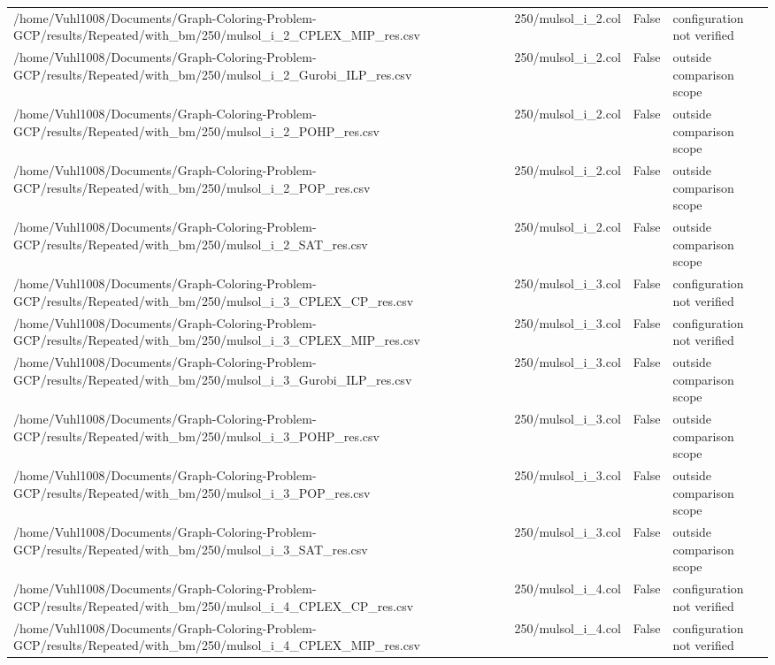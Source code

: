 \begin{table}[htbp]
\begin{tabular}{llll}
/home/Vuhl1008/Documents/Graph-Coloring-Problem-GCP/results/Repeated/with\_bm/250/mulsol\_i\_2\_CPLEX\_MIP\_res.csv & 250/mulsol\_i\_2.col & False & configuration not verified \\
/home/Vuhl1008/Documents/Graph-Coloring-Problem-GCP/results/Repeated/with\_bm/250/mulsol\_i\_2\_Gurobi\_ILP\_res.csv & 250/mulsol\_i\_2.col & False & outside comparison scope \\
/home/Vuhl1008/Documents/Graph-Coloring-Problem-GCP/results/Repeated/with\_bm/250/mulsol\_i\_2\_POHP\_res.csv & 250/mulsol\_i\_2.col & False & outside comparison scope \\
/home/Vuhl1008/Documents/Graph-Coloring-Problem-GCP/results/Repeated/with\_bm/250/mulsol\_i\_2\_POP\_res.csv & 250/mulsol\_i\_2.col & False & outside comparison scope \\
/home/Vuhl1008/Documents/Graph-Coloring-Problem-GCP/results/Repeated/with\_bm/250/mulsol\_i\_2\_SAT\_res.csv & 250/mulsol\_i\_2.col & False & outside comparison scope \\
/home/Vuhl1008/Documents/Graph-Coloring-Problem-GCP/results/Repeated/with\_bm/250/mulsol\_i\_3\_CPLEX\_CP\_res.csv & 250/mulsol\_i\_3.col & False & configuration not verified \\
/home/Vuhl1008/Documents/Graph-Coloring-Problem-GCP/results/Repeated/with\_bm/250/mulsol\_i\_3\_CPLEX\_MIP\_res.csv & 250/mulsol\_i\_3.col & False & configuration not verified \\
/home/Vuhl1008/Documents/Graph-Coloring-Problem-GCP/results/Repeated/with\_bm/250/mulsol\_i\_3\_Gurobi\_ILP\_res.csv & 250/mulsol\_i\_3.col & False & outside comparison scope \\
/home/Vuhl1008/Documents/Graph-Coloring-Problem-GCP/results/Repeated/with\_bm/250/mulsol\_i\_3\_POHP\_res.csv & 250/mulsol\_i\_3.col & False & outside comparison scope \\
/home/Vuhl1008/Documents/Graph-Coloring-Problem-GCP/results/Repeated/with\_bm/250/mulsol\_i\_3\_POP\_res.csv & 250/mulsol\_i\_3.col & False & outside comparison scope \\
/home/Vuhl1008/Documents/Graph-Coloring-Problem-GCP/results/Repeated/with\_bm/250/mulsol\_i\_3\_SAT\_res.csv & 250/mulsol\_i\_3.col & False & outside comparison scope \\
/home/Vuhl1008/Documents/Graph-Coloring-Problem-GCP/results/Repeated/with\_bm/250/mulsol\_i\_4\_CPLEX\_CP\_res.csv & 250/mulsol\_i\_4.col & False & configuration not verified \\
/home/Vuhl1008/Documents/Graph-Coloring-Problem-GCP/results/Repeated/with\_bm/250/mulsol\_i\_4\_CPLEX\_MIP\_res.csv & 250/mulsol\_i\_4.col & False & configuration not verified \\

\end{tabular}
\end{table}
